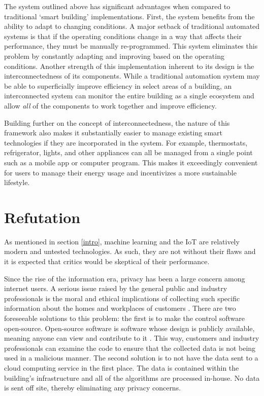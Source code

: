 \documentclass[letterpaper]{article}
\begin{document}
The system outlined above has significant advantages when compared to traditional `smart building' implementations. First, the system benefits from the ability to adapt to changing conditions. A major setback of traditional automated systems is that if the operating conditions change in a way that affects their performance, they must be manually re-programmed. This system eliminates this problem by constantly adapting and improving based on the operating conditions. Another strength of this implementation inherent to its design is the interconnectedness of its components. While a traditional automation system may be able to superficially improve efficiency in select areas of a building, an interconnected system can monitor the entire building as a single ecosystem and allow \emph{all} of the components to work together and improve efficiency.\par

Building further on the concept of interconnectedness, the nature of this framework also makes it substantially easier to manage existing smart technologies if they are incorporated in the system. For example, thermostats, refrigerator, lights, and other appliances can all be managed from a single point such as a mobile app or computer program. This makes it exceedingly convenient for users to manage their energy usage and incentivizes a more sustainable lifestyle.

\section{Refutation} \label{refute}
As mentioned in section \ref{intro}, machine learning and the IoT are relatively modern and untested technologies. As such, they are not without their flaws and it is expected that critics would be skeptical of their performance.\par

Since the rise of the information era, privacy has been a large concern among internet users. A serious issue raised by the general public and industry professionals is the moral and ethical implications of collecting such specific information about the homes and workplaces of customers \cite{perisic16, mccalman17}. There are two foreseeable solutions to this problem: the first is to make the control software open-source. Open-source software is software whose design is publicly available, meaning anyone can view and contribute to it \cite{opensource}. This way, customers and industry professionals can examine the code to ensure that the collected data is not being used in a malicious manner. The second solution is to not have the data sent to a cloud computing service in the first place. The data is contained within the building's infrastructure and all of the algorithms are processed in-house. No data is sent off site, thereby eliminating any privacy concerns.\par
\end{document}
